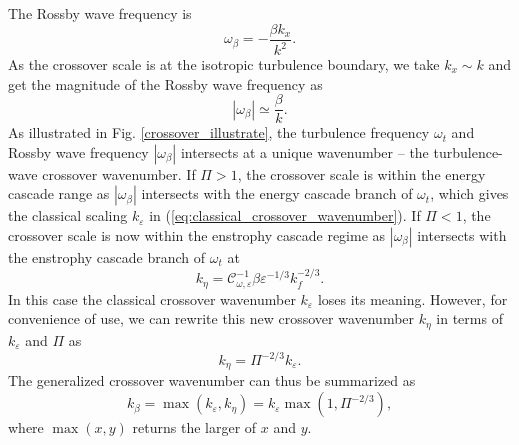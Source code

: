 \documentclass{ametsoc}
\begin{document}
The Rossby wave frequency is 
\begin{equation}
\omega_{\beta}=-\frac{\beta k_{x}}{k^{2}}.\label{eq:Rossby_wave_freq_kx_k}
\end{equation}
As the crossover scale is at the isotropic turbulence boundary, we
take $k_{x}\sim k$ and get the magnitude of the Rossby wave frequency as
\begin{equation}
|\omega_{\beta}|\simeq\frac{\beta}{k}.\label{eq:Rossby_wave_freq_k}
\end{equation}
As illustrated in Fig. \ref{crossover_illustrate}, the turbulence frequency
$\omega_{t}$ and Rossby wave frequency $|\omega_{\beta}|$ intersects at a
unique wavenumber -- the turbulence-wave crossover wavenumber.
If $\Pi>1$, the crossover scale is within the energy cascade range as
$|\omega_\beta|$ intersects with the energy cascade branch of $\omega_t$,
which gives the classical scaling $k_\varepsilon$ in (\ref{eq:classical_crossover_wavenumber}).
If $\Pi<1$, the crossover scale is now within the enstrophy cascade regime
as $|\omega_\beta|$ intersects with the enstrophy cascade branch of $\omega_t$
at 
\begin{equation}
k_{\eta}=\mathcal{C}_{\omega,\varepsilon}^{-1}\beta\varepsilon^{-1/3}k_{f}^{-2/3}.\label{eq:crossover_k_enstrophy_branch}
\end{equation}
In this case the classical crossover wavenumber $k_\varepsilon$ loses its meaning.
However, for convenience of use, we can rewrite this new crossover wavenumber $k_\eta$
in terms of $k_\varepsilon$ and $\Pi$ as
\begin{equation}
k_{\eta}=\Pi^{-2/3}k_{\varepsilon}.\label{eq:k_eta_k_epsilon_relation}
\end{equation}
The generalized crossover wavenumber can thus be summarized as
\begin{equation}
k_{\beta}=\max(k_{\varepsilon},k_{\eta})=k_{\varepsilon}\max(1,\Pi^{-2/3}),\label{eq:generalized_crossover_wavenumber}
\end{equation}
where $\max(x,y)$ returns the larger of $x$ and $y$. 
\end{document}
